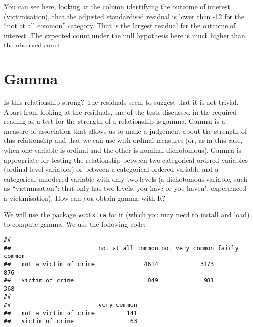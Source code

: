 \documentclass[
]{book}
\newenvironment{Shaded}{\begin{snugshade}}{\end{snugshade}}
\newcommand{\CommentTok}[1]{\textcolor[rgb]{0.56,0.35,0.01}{\textit{#1}}}
\newcommand{\FloatTok}[1]{\textcolor[rgb]{0.00,0.00,0.81}{#1}}
\newcommand{\FunctionTok}[1]{\textcolor[rgb]{0.13,0.29,0.53}{\textbf{#1}}}
\newcommand{\NormalTok}[1]{#1}
\newcommand{\OtherTok}[1]{\textcolor[rgb]{0.56,0.35,0.01}{#1}}
\newcommand{\SpecialCharTok}[1]{\textcolor[rgb]{0.81,0.36,0.00}{\textbf{#1}}}
\begin{document}
You can see here, looking at the column identifying the outcome of interest (victimisation), that the adjusted standardised residual is lower than -12 for the ``not at all common'' category. That is the largest residual for the outcome of interest. The expected count under the null hypothesis here is much higher than the observed count.

\section{Gamma}\label{gamma}

Is this relationship strong? The residuals seem to suggest that it is not trivial. Apart from looking at the residuals, one of the tests discussed in the required reading as a test for the strength of a relationship is gamma. Gamma is a measure of association that allows us to make a judgement about the strength of this relationship and that we can use with ordinal measures (or, as in this case, when one variable is ordinal and the other is nominal dichotomous). Gamma is appropriate for testing the relationship between two categorical ordered variables (ordinal-level variables) or between a categorical ordered variable and a categorical unordered variable with only two levels (a dichotomous variable, such as ``victimisation'': that only has two levels, you have or you haven't experienced a victimisation). How can you obtain gamma with R?

We will use the package \texttt{vcdExtra} for it (which you may need to install and load) to compute gamma. We use the following code:

\begin{Shaded}
\end{Shaded}

\begin{verbatim}
##                        
##                         not at all common not very common fairly common
##   not a victim of crime              4614            3173           876
##   victim of crime                     849             981           368
##                        
##                         very common
##   not a victim of crime         141
##   victim of crime                63
\end{verbatim}
\end{document}

